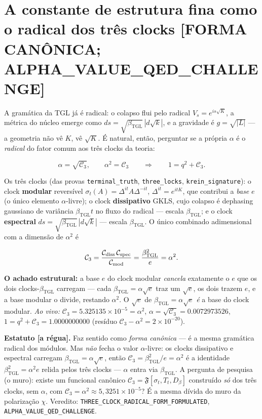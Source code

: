 \documentclass[11pt]{article}
\newcommand{\bTGL}{\beta_{\mathrm{TGL}}}\newcommand{\Msun}{M_{\odot}}\newcommand{\TGL}{\mathrm{TGL}}
\theoremstyle{definition}\newtheorem{deriv}{Derivação}
\begin{document}
\section{A constante de estrutura fina como o radical dos três clocks \textsf{[FORMA CANÔNICA; ALPHA\_VALUE\_QED\_CHALLENGE]}}

A gramática da TGL já é radical: o colapso flui pelo radical $V_s=e^{is\sqrt K}$, a métrica do núcleo emerge como $ds=\sqrt{\bTGL}\,|d\sqrt k|$, e a gravidade é $g=\sqrt{|L|}$ --- a geometria não vê $K$, vê $\sqrt K$. É natural, então, perguntar se a própria $\alpha$ é o \emph{radical} do fator comum aos três clocks da teoria:

\begin{equation} \alpha=\sqrt{\mathcal C_3},\qquad \alpha^2=\mathcal C_3 \qquad\Longrightarrow\qquad 1=q^2+\mathcal C_3.\end{equation}

Os três clocks (das provas \texttt{terminal\_truth}, \texttt{three\_locks}, \texttt{krein\_signature}): o clock \textbf{modular} reversível $\sigma_t(A)=\Delta^{it}A\Delta^{-it}$, $\Delta^{it}=e^{itK}$, que contribui a \emph{base} $e$ (o único elemento $\alpha$-livre); o clock \textbf{dissipativo} GKLS, cujo colapso é dephasing gaussiano de variância $\bTGL t$ no fluxo do radical --- escala $\bTGL$; e o clock \textbf{espectral} $ds=\sqrt{\bTGL}\,|d\sqrt k|$ --- escala $\bTGL$. O único combinado adimensional com a dimensão de $\alpha^2$ é

\begin{equation} \mathcal C_3=\frac{\mathcal C_{\rm diss}\,\mathcal C_{\rm spec}}{\mathcal C_{\rm mod}}=\frac{\bTGL^2}{e}=\alpha^2.\end{equation}

\textbf{O achado estrutural:} a base $e$ do clock modular \emph{cancela} exatamente o $e$ que os dois clocks-$\bTGL$ carregam --- cada $\bTGL=\alpha\sqrt e$ traz um $\sqrt e$, os dois trazem $e$, e a base modular o divide, restando $\alpha^2$. O $\sqrt e$ de $\bTGL=\alpha\sqrt e$ \emph{é} a base do clock modular. \emph{Ao vivo:} $\mathcal C_3=5.325135\times10^{-5}=\alpha^2$, $\alpha=\sqrt{\mathcal C_3}=0.0072973526$, $1=q^2+\mathcal C_3=1.0000000000$ (resíduo $\mathcal C_3-\alpha^2=2\times10^{-20}$).

\textbf{Estatuto \textsf{[a régua]}.} Faz sentido como \emph{forma canônica} --- é a mesma gramática radical dos módulos. Mas \emph{não} fecha o valor $\alpha$-livre: os clocks dissipativo e espectral carregam $\bTGL=\alpha\sqrt e$, então $\mathcal C_3=\bTGL^2/e=\alpha^2$ é a identidade $\bTGL^2=\alpha^2 e$ relida pelos três clocks --- $\alpha$ entra via $\bTGL$. A pergunta de pesquisa (o muro): existe um funcional canônico $\mathcal C_3=\mathfrak F[\sigma_t,T_t,D_\beta]$ construído \emph{só} dos três clocks, sem $\alpha$, com $\mathcal C_3=\alpha^2\approx5{,}3251\times10^{-5}$? É a mesma dívida do muro da polarização $\chi$. Veredito: \texttt{THREE\_CLOCK\_RADICAL\_FORM\_FORMULATED}, \texttt{ALPHA\_VALUE\_QED\_CHALLENGE}.
\end{document}
